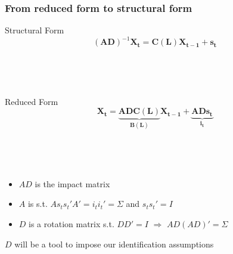 \documentclass{beamer}
\begin{document}
\begin{frame}
	\frametitle{From reduced form to structural form}
	\label{identification}
	
Structural Form	
\begin{equation}
(\mathbf{AD})^{-1}
    \mathbf{X_{t}}
= \mathbf{C(L)} 
\mathbf{X_{t-1}}
+ \mathbf{s_t}
\end{equation}

\

\

Reduced Form
\begin{equation}
\mathbf{X_{t}}
= \underbrace{\mathbf{AD} \mathbf{C(L)}}_\text{$\mathbf{B(L)}$} 
\mathbf{X_{t-1}}
+ \underbrace{\mathbf{AD} \mathbf{s_t}}_\text{$\mathbf{i_t}$}
\end{equation}

\

\

\begin{itemize}
	\item $AD$ is the impact matrix
	\item $A$ is s.t. $As_t s_t' A' = i_t i_t' = \Sigma$ and $s_t s_t' = I$
	\item $D$ is a rotation matrix s.t. $DD' = I$ $\Rightarrow$ $AD(AD)' = \Sigma$
\end{itemize}

$D$ will be a tool to impose our identification assumptions \hyperlink{Technicalities}{}

\end{frame}
\end{document}
